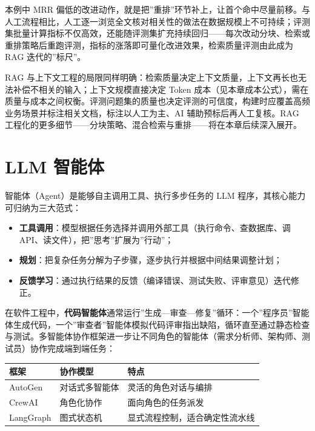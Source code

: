 \documentclass[12pt,a4paper,twoside,openany]{ctexbook}
\numberwithin{figure}{chapter}
\numberwithin{table}{chapter}
\providecommand{\tightlist}{\setlength{\itemsep}{0pt}\setlength{\parskip}{0pt}}
\newcounter{none}
\begin{document}
本例中 MRR
偏低的改进动作，就是把''重排''环节补上，让首个命中尽量前移。与人工流程相比，人工逐一浏览全文核对相关性的做法在数据规模上不可持续；评测集批量计算指标不仅高效，还能随评测集扩充持续回归------每次改动分块、检索或重排策略后重跑评测，指标的涨落即可量化改进效果，检索质量评测由此成为
RAG 迭代的''标尺''。

RAG
与上下文工程的局限同样明确：检索质量决定上下文质量，上下文再长也无法补偿不相关的输入；上下文规模直接决定
Token
成本（见本章成本公式），需在质量与成本之间权衡。评测问题集的质量也决定评测的可信度，构建时应覆盖高频业务场景并标注相关文档，标注以人工为主、AI
辅助预标后再人工复核。RAG
工程化的更多细节------分块策略、混合检索与重排------将在本章后续深入展开。

\section{LLM 智能体}\label{llm-ux667aux80fdux4f53}

智能体（Agent）是能够自主调用工具、执行多步任务的 LLM
程序，其核心能力可归纳为三大范式：

\begin{itemize}
\tightlist
\item
  \textbf{工具调用}：模型根据任务选择并调用外部工具（执行命令、查数据库、调
  API、读文件），把''思考''扩展为''行动''；
\item
  \textbf{规划}：把复杂任务分解为子步骤，逐步执行并根据中间结果调整计划；
\item
  \textbf{反馈学习}：通过执行结果的反馈（编译错误、测试失败、评审意见）迭代修正。
\end{itemize}

在软件工程中，\textbf{代码智能体}通常运行''生成---审查---修复''循环：一个''程序员''智能体生成代码，一个''审查者''智能体模拟代码评审指出缺陷，循环直至通过静态检查与测试。多智能体协作框架进一步让不同角色的智能体（需求分析师、架构师、测试员）协作完成端到端任务：

{\def\LTcaptype{none} %
\begin{longtable}[]{@{}lll@{}}
\toprule\noalign{}
框架 & 协作模型 & 特点 \\
\midrule\noalign{}
\endhead
\bottomrule\noalign{}
\endlastfoot
AutoGen & 对话式多智能体 & 灵活的角色对话与编排 \\
CrewAI & 角色化协作 & 面向角色的任务派发 \\
LangGraph & 图式状态机 & 显式流程控制，适合确定性流水线 \\
\end{longtable}
}
\end{document}
